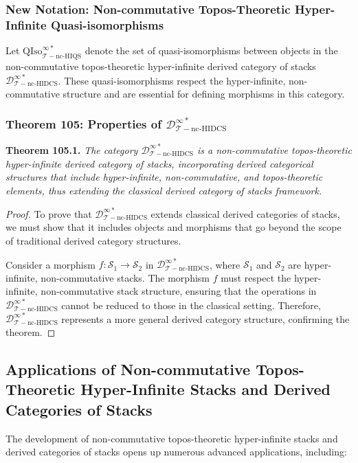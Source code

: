 \documentclass{article}
\begin{document}
\subsubsection{New Notation: Non-commutative Topos-Theoretic Hyper-Infinite Quasi-isomorphisms}
Let \(\text{QIso}_{\mathcal{T}-\text{nc-HIQS}}^{\infty *}\) denote the set of quasi-isomorphisms between objects in the non-commutative topos-theoretic hyper-infinite derived category of stacks \(\mathcal{D}_{\mathcal{T}-\text{nc-HIDCS}}^{\infty *}\). These quasi-isomorphisms respect the hyper-infinite, non-commutative structure and are essential for defining morphisms in this category.

\subsubsection{Theorem 105: Properties of \(\mathcal{D}_{\mathcal{T}-\text{nc-HIDCS}}^{\infty *}\)}
\textbf{Theorem 105.1.} \textit{The category \(\mathcal{D}_{\mathcal{T}-\text{nc-HIDCS}}^{\infty *}\) is a non-commutative topos-theoretic hyper-infinite derived category of stacks, incorporating derived categorical structures that include hyper-infinite, non-commutative, and topos-theoretic elements, thus extending the classical derived category of stacks framework.}

\begin{proof}
To prove that \(\mathcal{D}_{\mathcal{T}-\text{nc-HIDCS}}^{\infty *}\) extends classical derived categories of stacks, we must show that it includes objects and morphisms that go beyond the scope of traditional derived category structures.

Consider a morphism \(f: \mathcal{S}_1 \to \mathcal{S}_2\) in \(\mathcal{D}_{\mathcal{T}-\text{nc-HIDCS}}^{\infty *}\), where \(\mathcal{S}_1\) and \(\mathcal{S}_2\) are hyper-infinite, non-commutative stacks. The morphism \(f\) must respect the hyper-infinite, non-commutative stack structure, ensuring that the operations in \(\mathcal{D}_{\mathcal{T}-\text{nc-HIDCS}}^{\infty *}\) cannot be reduced to those in the classical setting. Therefore, \(\mathcal{D}_{\mathcal{T}-\text{nc-HIDCS}}^{\infty *}\) represents a more general derived category structure, confirming the theorem.
\end{proof}

\subsection{Applications of Non-commutative Topos-Theoretic Hyper-Infinite Stacks and Derived Categories of Stacks}
The development of non-commutative topos-theoretic hyper-infinite stacks and derived categories of stacks opens up numerous advanced applications, including:
\end{document}
